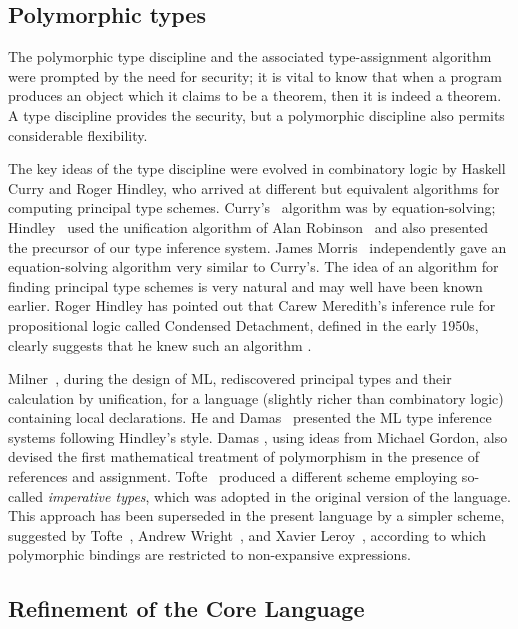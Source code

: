 \subsection*{Polymorphic types}

The polymorphic type discipline and the associated type-assignment algorithm
were\linebreak
 prompted by the need for security;  it is vital to know that when
a program produces an object which it claims to be a theorem, then it
is indeed a theorem.  A type discipline provides the security, but a
polymorphic discipline also permits considerable flexibility.

The key ideas of the type discipline were evolved in combinatory logic by
Haskell Curry and Roger Hindley, who arrived at different but equivalent
algorithms for computing principal type schemes.  Curry's~\cite{Cur} algorithm
was by equation-solving; Hindley~\cite{Hin} used the unification algorithm of
Alan Robinson~\cite{Rob} and also presented the precursor of our type
inference system.  James Morris~\cite{Mor} independently gave an
equation-solving algorithm very similar to Curry's.  The idea of an algorithm
for finding principal type schemes is very natural and may well have been
known earlier. Roger Hindley has pointed out that Carew
Meredith's inference rule for propositional logic called Condensed Detachment,
defined in the early 1950s, clearly suggests that he knew such an algorithm
\cite{Mer}.

Milner~\cite{Mil1}, during the design of ML, rediscovered principal types and
their calculation by unification, for a language (slightly richer than
combinatory logic) containing local declarations.  He and Damas~\cite{DM}
presented the ML type inference systems following Hindley's style.  Damas
\cite{Dam}, using ideas from Michael Gordon, also devised the first
mathematical treatment of polymorphism in the presence of references and
assignment.  Tofte~\cite{Tof-a} produced a different scheme employing
so-called {\em imperative types}, which was adopted in the original version of
the language.  This approach has been superseded in the present language by a
simpler scheme, suggested by Tofte~\cite{Tof-a}, Andrew Wright~\cite{wright95}, and
Xavier Leroy~\cite{Ler1}, according to which polymorphic bindings are
restricted to non-expansive expressions.

\subsection*{Refinement of the Core Language}

